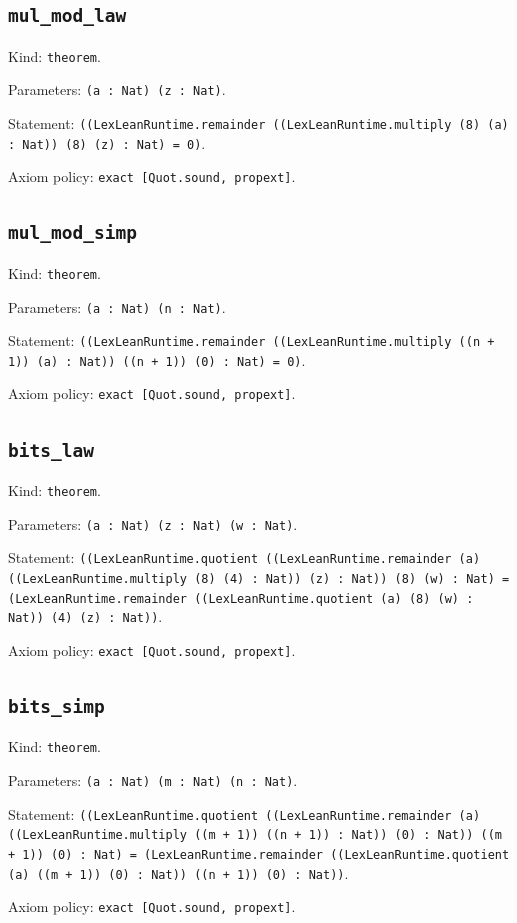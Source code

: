 \documentclass[11pt]{article}
\begin{document}
\subsection*{\texttt{mul\_mod\_law}}
\noindent Kind: \texttt{theorem}.\par
\noindent Parameters: \texttt{(a : Nat) (z : Nat)}.\par
\noindent Statement: \texttt{((LexLeanRuntime.remainder ((LexLeanRuntime.multiply (8) (a) : Nat)) (8) (z) : Nat) = 0)}.\par
\noindent Axiom policy: \texttt{exact [Quot.sound, propext]}.\par
\subsection*{\texttt{mul\_mod\_simp}}
\noindent Kind: \texttt{theorem}.\par
\noindent Parameters: \texttt{(a : Nat) (n : Nat)}.\par
\noindent Statement: \texttt{((LexLeanRuntime.remainder ((LexLeanRuntime.multiply ((n + 1)) (a) : Nat)) ((n + 1)) (0) : Nat) = 0)}.\par
\noindent Axiom policy: \texttt{exact [Quot.sound, propext]}.\par
\subsection*{\texttt{bits\_law}}
\noindent Kind: \texttt{theorem}.\par
\noindent Parameters: \texttt{(a : Nat) (z : Nat) (w : Nat)}.\par
\noindent Statement: \texttt{((LexLeanRuntime.quotient ((LexLeanRuntime.remainder (a) ((LexLeanRuntime.multiply (8) (4) : Nat)) (z) : Nat)) (8) (w) : Nat) = (LexLeanRuntime.remainder ((LexLeanRuntime.quotient (a) (8) (w) : Nat)) (4) (z) : Nat))}.\par
\noindent Axiom policy: \texttt{exact [Quot.sound, propext]}.\par
\subsection*{\texttt{bits\_simp}}
\noindent Kind: \texttt{theorem}.\par
\noindent Parameters: \texttt{(a : Nat) (m : Nat) (n : Nat)}.\par
\noindent Statement: \texttt{((LexLeanRuntime.quotient ((LexLeanRuntime.remainder (a) ((LexLeanRuntime.multiply ((m + 1)) ((n + 1)) : Nat)) (0) : Nat)) ((m + 1)) (0) : Nat) = (LexLeanRuntime.remainder ((LexLeanRuntime.quotient (a) ((m + 1)) (0) : Nat)) ((n + 1)) (0) : Nat))}.\par
\noindent Axiom policy: \texttt{exact [Quot.sound, propext]}.\par
\end{document}
